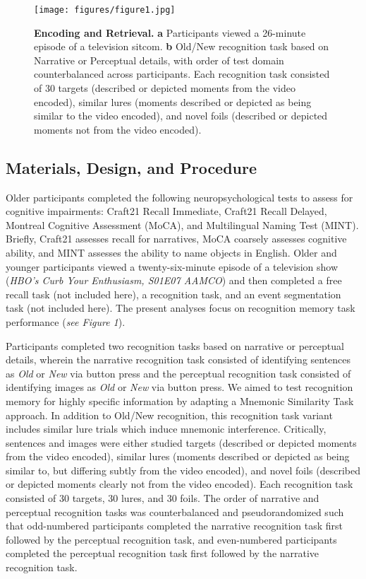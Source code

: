 \documentclass[11pt]{article}
\begin{document}
\begin{figure}
\centering
\texttt{[image: figures/figure1.jpg]}
\caption{\small \textbf{Encoding and Retrieval.} \textbf{a} Participants viewed a 26-minute episode of a television sitcom. \textbf{b} Old/New recognition task based on Narrative or Perceptual details, with order of test domain counterbalanced across participants. Each recognition task consisted of 30 targets (described or depicted moments from the video encoded), similar lures (moments described or depicted as being similar to the video encoded), and novel foils (described or depicted moments not from the video encoded).}
\label{fig:schematic}
\end{figure}

\subsection*{Materials, Design, and Procedure}
Older participants completed the following neuropsychological tests to assess for cognitive impairments: Craft21 Recall Immediate, Craft21 Recall Delayed, Montreal Cognitive Assessment (MoCA), and Multilingual Naming Test (MINT). Briefly, Craft21 assesses recall for narratives, MoCA coarsely assesses cognitive ability, and MINT assesses the ability to name objects in English. Older and younger participants viewed a twenty-six-minute episode of a television show (\textit{HBO’s Curb Your Enthusiasm, S01E07 AAMCO}) and then completed a free recall task (not included here), a recognition task, and an event segmentation task (not included here). The present analyses focus on recognition memory task performance (\textit{see Figure 1}).

Participants completed two recognition tasks based on narrative or perceptual details, wherein the narrative recognition task consisted of identifying sentences as \textit{Old} or \textit{New} via button press and the perceptual recognition task consisted of identifying images as \textit{Old} or \textit{New} via button press. We aimed to test recognition memory for highly specific information by adapting a Mnemonic Similarity Task approach. In addition to Old/New recognition, this recognition task variant includes similar lure trials which induce mnemonic interference. Critically, sentences and images were either studied targets (described or depicted moments from the video encoded), similar lures (moments described or depicted as being similar to, but differing subtly from the video encoded), and novel foils (described or depicted moments clearly not from the video encoded). Each recognition task consisted of 30 targets, 30 lures, and 30 foils. The order of narrative and perceptual recognition tasks was counterbalanced and pseudorandomized such that odd-numbered participants completed the narrative recognition task first followed by the perceptual recognition task, and even-numbered participants completed the perceptual recognition task first followed by the narrative recognition task.       
\end{document}

